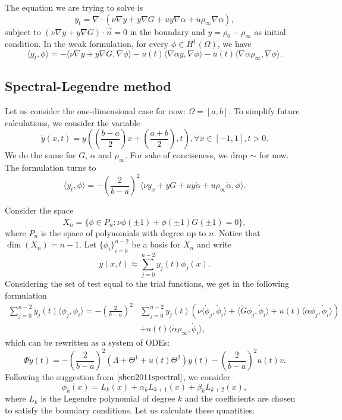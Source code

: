 \documentclass[12pt]{article}
\newcommand{\n}{\vec{n}}
\newcommand{\steady}{\rho_{\infty}}
\newcommand{\inner}[2]{\langle{} #1, #2 \rangle{}}
\theoremstyle{definition}
\begin{document}
The equation we are trying to solve is 
\[
y_t = \nabla \cdot (\nu \nabla y + y \nabla G + u y \nabla \alpha + u \steady \nabla \alpha),
\]
subject to $(\nu \nabla y + y \nabla G) \cdot \n = 0$ in the boundary and $y = \rho_0 - \steady$ as initial condition.
In the weak formulation, for every $\phi \in H^1(\Omega)$, we have
\[
\inner{y_t}{\phi} = -\inner{\nu \nabla y + y \nabla G}{\nabla \phi} - u(t)\inner{\nabla \alpha y}{\nabla \phi} - u(t)\inner{ \nabla \alpha \steady}{\nabla \phi}.
\]

\subsection{Spectral-Legendre method}

Let us consider the one-dimensional case for now: $\Omega = [a,b]$.
To simplify future calculations, we consider the variable
\[
\tilde{y}(x,t) = y\left(\left(\frac{b-a}{2}\right)x + \left(\frac{a+b}{2}\right), t\right), \forall x \in [-1,1], t > 0.    
\]
We do the same for $G$, $\alpha$ and $\steady$. 
For sake of conciseness, we drop $\sim$ for now.
The formulation turns to 
\[
\inner{y_t}{\phi} = - {\left(\frac{2}{b-a}\right)}^2\inner{\nu y_x + y \dot{G} + u y \dot{\alpha} + u\steady \dot{\alpha}}{\dot{\phi}}.
\]

Consider the space 
\[
X_n = \{\phi \in P_n : \nu \dot{\phi}(\pm 1) + \phi(\pm 1) \dot{G}(\pm 1) = 0\},
\]
where $P_n$ is the space of polynomials with degree up to $n$.
Notice that $\dim(X_n) = n-1$.
Let ${\{\phi_i\}}_{i=0}^{n-2}$ be a basis for $X_n$ and write 
\[
y(x,t) \approx \sum_{j=0}^{n-2} y_j(t) \phi_j(x). 
\]
Considering the set of test equal to the trial functions, we get in the following formulation
\[
\begin{split}
    \sum_{j=0}^{n-2} \dot{y}_j(t) \inner{\phi_j}{\phi_i} = -{\left(\frac{2}{b-a}\right)}^2 &\sum_{j=0}^{n-2} y_j(t) \left(\nu \inner{\dot{\phi}_j}{\dot{\phi}_i} + \inner{\dot{G} \phi_j}{\dot{\phi}_i} + u(t)\inner{\dot{\alpha}\phi_j}{\dot{\phi}_i} \right) \\ 
    &+ u(t) \inner{\dot{\alpha} \steady}{\dot{\phi}_i},
\end{split}
\]
which can be rewritten as a system of ODEs:
\[
\Phi \dot{y}(t) = -{\left(\frac{2}{b-a}\right)}^2 (\Lambda + \Theta^1 + u(t)\Theta^2)y(t) - {\left(\frac{2}{b-a}\right)}^2u(t)v.    
\]
Following the suggestion from $\cite[p.7]{shen2011spectral}$, we consider
\[
\phi_k(x) = L_k(x) + \alpha_k L_{k+1}(x) + \beta_k L_{k+2}(x),    
\]
where $L_k$ is the Legendre polynomial of degree $k$ and the coefficients are chosen to satisfy the boundary conditions. 
Let us calculate these quantities:
\end{document}
